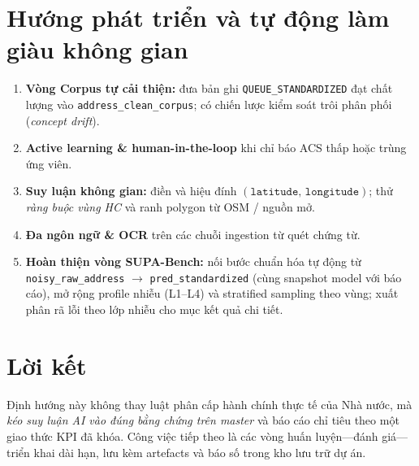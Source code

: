 \section{Hướng phát triển và tự động làm giàu không gian}
\begin{enumerate}
  \item \textbf{Vòng Corpus tự cải thiện:} đưa bản ghi \texttt{QUEUE\_STANDARDIZED} đạt chất lượng vào \texttt{address\_clean\_corpus}; có chiến lược kiểm soát trôi phân phối (\emph{concept drift}).
  \item \textbf{Active learning \& human-in-the-loop} khi chỉ báo ACS thấp hoặc trùng ứng viên.
  \item \textbf{Suy luận không gian:} điền và hiệu đính \((\texttt{latitude},\, \texttt{longitude})\); thử \emph{ràng buộc vùng HC} và ranh polygon từ OSM / nguồn mở.
  \item \textbf{Đa ngôn ngữ \& OCR} trên các chuỗi ingestion từ quét chứng từ.
  \item \textbf{Hoàn thiện vòng SUPA-Bench:} nối bước chuẩn hóa tự động từ \texttt{noisy\_raw\_address} \(\rightarrow\) \texttt{pred\_standardized} (cùng snapshot model với báo cáo), mở rộng profile nhiễu (L1--L4) và stratified sampling theo vùng; xuất phân rã lỗi theo lớp nhiễu cho mục kết quả chi tiết.
\end{enumerate}

\section{Lời kết}
Định hướng này không thay luật phân cấp hành chính thực tế của Nhà nước, mà \emph{kéo suy luận AI vào đúng bằng chứng trên master} và báo cáo chỉ tiêu theo một giao thức KPI đã khóa. Công việc tiếp theo là các vòng huấn luyện---đánh giá---triển khai dài hạn, lưu kèm artefacts và báo số trong kho lưu trữ dự án.
